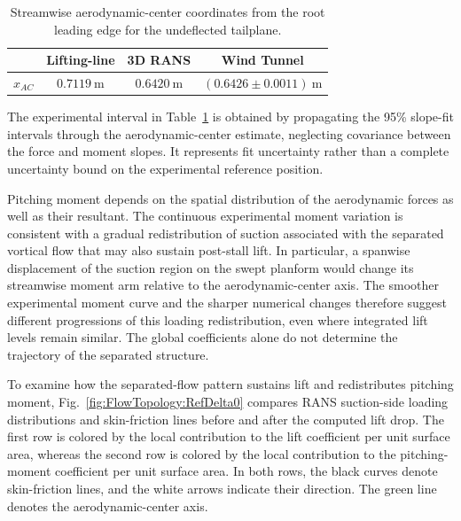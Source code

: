 \documentclass[journal ]{new-aiaa}
\begin{document}
\begin{table}[htbp]
    \centering
    \caption{Streamwise aerodynamic-center coordinates from the root leading edge for the undeflected tailplane.}
    \begin{tabular}{cccc}
         \hline
         \hline
         & Lifting-line & 3D RANS & Wind Tunnel \\
         \hline
         $x_{AC}$ & $0.7119~\mathrm{m}$ & $0.6420~\mathrm{m}$ & $(0.6426\pm0.0011)~\mathrm{m}$ \\
         \hline
         \hline
    \end{tabular}
    \label{tab:Delta0:AC}
\end{table}

The experimental interval in Table~\ref{tab:Delta0:AC} is obtained by propagating the 95\% slope-fit intervals through the aerodynamic-center estimate, neglecting covariance between the force and moment slopes. It represents fit uncertainty rather than a complete uncertainty bound on the experimental reference position.

Pitching moment depends on the spatial distribution of the aerodynamic forces as well as their resultant.
The continuous experimental moment variation is consistent with a gradual redistribution of suction associated with the separated vortical flow that may also sustain post-stall lift. In particular, a spanwise displacement of the suction region on the swept planform would change its streamwise moment arm relative to the aerodynamic-center axis.
The smoother experimental moment curve and the sharper numerical changes therefore suggest different progressions of this loading redistribution, even where integrated lift levels remain similar. The global coefficients alone do not determine the trajectory of the separated structure.

To examine how the separated-flow pattern sustains lift and redistributes pitching moment, Fig.~\ref{fig:FlowTopology:RefDelta0} compares RANS suction-side loading distributions and skin-friction lines before and after the computed lift drop.
The first row is colored by the local contribution to the lift coefficient per unit surface area, whereas the second row is colored by the local contribution to the pitching-moment coefficient per unit surface area.
In both rows, the black curves denote skin-friction lines, and the white arrows indicate their direction. The green line denotes the aerodynamic-center axis.
\end{document}
